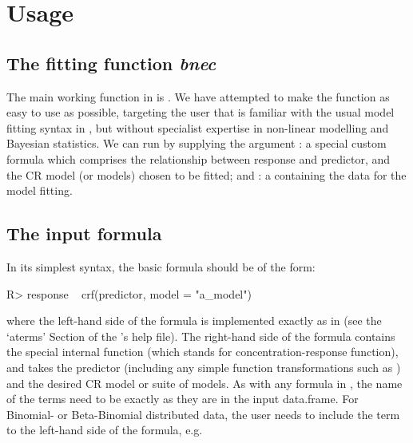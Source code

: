 \documentclass[
  shortnames]{jss}
\begin{document}
\hypertarget{usage}{%
\section{Usage}\label{usage}}

\subsection[The fitting function bnec]{The fitting function \emph{bnec}}\label{ffbnec}

The main working function in  is . We have attempted to make the  function as easy to use as possible, targeting the  user that is familiar with the usual model fitting syntax in , but without specialist expertise in non-linear modelling and Bayesian statistics. We can run  by supplying the argument : a special custom formula which comprises the relationship between response and predictor, and the CR model (or models) chosen to be fitted; and : a  containing the data for the model fitting.

\hypertarget{the-input-formula}{%
\subsection{The input formula}\label{the-input-formula}}

In its simplest syntax, the basic  formula should be of the form:

\begin{CodeChunk}
\begin{CodeInput}
R> response ~ crf(predictor, model = "a_model")
\end{CodeInput}
\end{CodeChunk}

where the left-hand side of the formula is implemented exactly as in  (see the `aterms' Section of the 's help file). The right-hand side of the formula contains the special internal function  (which stands for concentration-response function), and takes the predictor (including any simple function transformations such as ) and the desired CR model or suite of models. As with any formula in , the name of the terms need to be exactly as they are in the input data.frame. For Binomial- or Beta-Binomial distributed data, the user needs to include the  term to the left-hand side of the formula, e.g.
\end{document}
